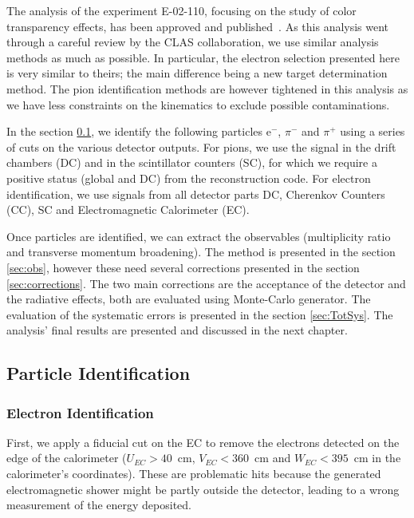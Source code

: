 The analysis of the experiment E-02-110, focusing on the study of color 
transparency effects, has been approved and published~\cite{ElFassi:2008}. As this 
analysis went through a careful review by the CLAS collaboration, we use
similar analysis methods as much as possible. In particular, the electron selection 
presented here is very similar to theirs; the main difference being a new 
target determination method. The pion identification methods are however tightened
in this analysis as we have less constraints on the kinematics to exclude possible
contaminations.

In the section \ref{sec:pid}, we identify the following particles e$^-$, 
$\pi^-$ and $\pi^+$ using a series of cuts on the various 
detector outputs. For pions, we use the signal in the drift chambers (DC) and 
in the scintillator counters (SC), for which we require a positive status (global and DC) 
from the reconstruction code. For electron identification, we use signals from 
all detector parts DC, Cherenkov Counters (CC), SC and Electromagnetic 
Calorimeter (EC).

Once particles are identified, we can extract the observables (multiplicity 
ratio and transverse momentum broadening). The method is presented in the 
section \ref{sec:obs}, however these need several corrections presented in the 
section \ref{sec:corrections}. The 
two main corrections are the acceptance of the detector and the radiative 
effects, both are evaluated using Monte-Carlo generator. The evaluation of 
the systematic errors is presented in the section \ref{sec:TotSys}.
The analysis' final results are presented and discussed in the next chapter.

\subsection{Particle Identification}
\label{sec:pid}

\subsubsection{Electron Identification}

First, we apply a fiducial cut on the EC to remove the electrons detected on 
the edge of the calorimeter ($U_{EC}>40$~cm, $V_{EC}<360$~cm and 
$W_{EC}<395$~cm in the calorimeter's coordinates). These are problematic hits 
because the generated electromagnetic shower might be partly outside the 
detector, leading to a wrong measurement of the energy deposited.

